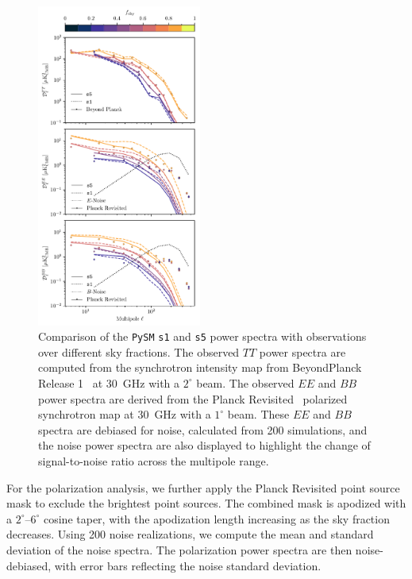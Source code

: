 \documentclass[twocolumn]{aastex631}
\begin{document}
\begin{figure}
   \centering
   \includegraphics[width=0.48\textwidth]{figures/Dlcomp_PySM3-4_s5_vs_BPPR_SYNC.pdf}
    \caption{Comparison of the \texttt{PySM} \texttt{s1} and \texttt{s5} power spectra with observations over different sky fractions. The observed $TT$ power spectra are computed from the synchrotron intensity map from  BeyondPlanck Release 1~\citep{Andersen:2023} at 30~GHz with a $2^\circ$ beam. The observed $EE$ and $BB$ power spectra are derived from the Planck Revisited~\citep{Delabrouille:2024} polarized synchrotron map at 30~GHz with a $1^\circ$ beam. These $EE$ and $BB$ spectra are debiased for noise, calculated from 200 simulations, and the noise power spectra are also displayed to highlight the change of signal-to-noise ratio across the multipole range.}
   \label{fig:Dl_sync_galmask}
\end{figure}

For the polarization analysis, we further apply the Planck Revisited point source mask to exclude the brightest point sources. The combined mask is apodized with a $2^\circ$--$6^\circ$ cosine taper, with the apodization length increasing as the sky fraction decreases. Using 200 noise realizations, we compute the mean and standard deviation of the noise spectra. The polarization power spectra are then noise-debiased, with error bars reflecting the noise standard deviation.
\end{document}
